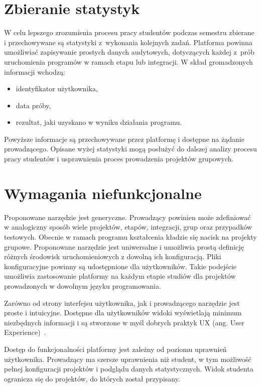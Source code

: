 \section{Zbieranie statystyk}

W celu lepszego zrozumienia procesu pracy studentów podczas semestru zbierane i przechowywane są statystyki z~wykonania kolejnych zadań.
Platforma powinna umożliwiać zapisywanie prostych danych audytowych, dotyczących każdej z~prób uruchomienia programów w ramach etapu lub integracji.
W skład gromadzonych informacji wchodzą:
\begin{itemize}
    \item identyfikator użytkownika,
    \item data próby,
    \item rezultat, jaki uzyskano w wyniku działania programu.
\end{itemize}
Powyższe informacje są przechowywane przez platformę i dostępne na żądanie prowadzącego.
Opisane wyżej statystyki mogą posłużyć do dalszej analizy procesu pracy studentów i usprawnienia proces prowadzenia projektów grupowych.


\section{Wymagania niefunkcjonalne}

Proponowane narzędzie jest generyczne.
Prowadzący powinien może zdefiniować w analogiczny sposób wiele projektów, etapów, integracji, grup oraz przypadków testowych.
Obecnie w ramach programu kształcenia kładzie się nacisk na projekty grupowe.
Proponowane narzędzie jest uniwersalne i umożliwia prostą definicję różnych środowisk uruchomieniowych z dowolną ich konfiguracją.
Pliki konfiguracyjne powinny są udostępnione dla użytkowników.
Takie podejście umożliwia zastosowanie platformy na każdym etapie studiów dla projektów prowadzonych w dowolnym języku programowania.

Zarówno od strony interfejsu użytkownika, jak i prowadzącego narzędzie jest proste i intuicyjne.
Dostępne dla użytkowników widoki wyświetlają minimum niezbędnych informacji i są stworzone w myśl dobrych praktyk UX (ang. User Experience)~\cite{ux-good-practicies}.

Dostęp do funkcjonalności platformy jest zależny od poziomu uprawnień użytkownika.
Prowadzący ma szersze uprawnienia niż student, w tym możliwość pełnej konfiguracji projektów i podglądu danych statystycznych.
Widok studenta ogranicza się do projektów, do których został przypisany.

